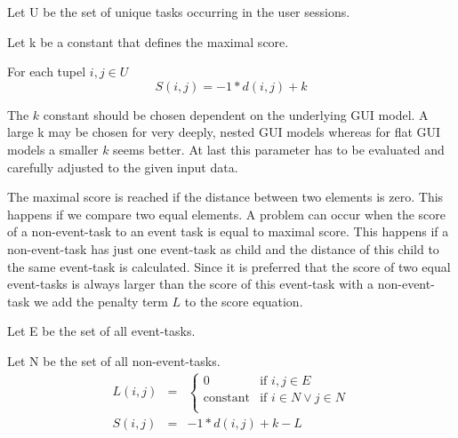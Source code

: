 \begin{definition}
	\item Let U be the set of unique tasks occurring in the user sessions.
	\item Let k be a constant that defines the maximal score.
	\item For each tupel $i,j \in U$
\begin{equation*}
		 S(i,j) = -1*d(i,j)+k
	\label{eq:subscore}
\end{equation*}
\label{def:scorewithmaximalscore}
\end{definition}
The $k$ constant should be chosen dependent on the underlying GUI model.
A large k may be chosen for very deeply, nested GUI models whereas for flat GUI models a smaller $k$ seems better.
At last this parameter has to be evaluated and carefully adjusted to the given input data.

The maximal score is reached if the distance between two elements is zero. This happens if we compare two equal elements.
A problem can occur when the score of a non-event-task to an event task is equal to maximal score.
This happens if a non-event-task has just one event-task as child and the distance of this child to the same event-task is calculated.
Since it is preferred that the score of two equal event-tasks is always larger than the score of this event-task with a non-event-task we add the penalty term $L$ to the score equation.

\begin{definition}
	\item Let E be the set of all event-tasks.
	\item Let N be the set of all non-event-tasks.
\begin{eqnarray*}
	L(i,j) &=&
	\begin{cases}
		0 & \text{if } i,j \in E \\
		\text{constant} & \text{if } i \in N \lor  j \in N\\
	\end{cases} \\
	S(i,j) &=& -1*d(i,j)+k-L
	\label{eq:subscore_adjusted}
\end{eqnarray*}
\label{def:scoreadjusted}
\end{definition}


